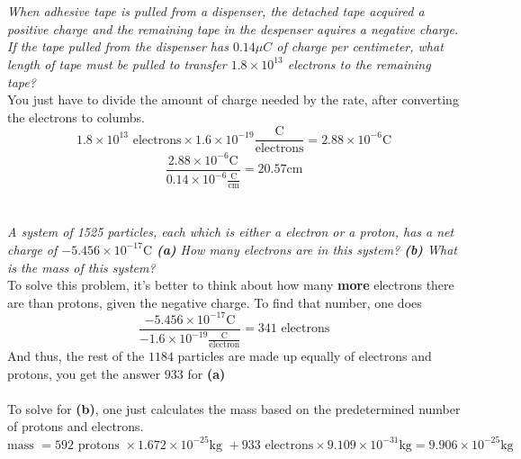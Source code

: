 \documentclass{article}
\begin{document}
\section{}
\emph{When adhesive tape is pulled from a dispenser, the detached tape acquired a positive charge and the remaining tape in the despenser aquires a negative charge. If the tape pulled from the dispenser has $0.14 \mu C$ of charge per centimeter, what length of tape must be pulled to transfer $1.8 \times 10 ^ 13$ electrons to the remaining tape? } \\
You just have to divide the amount of charge needed by the rate, after converting the electrons to columbs.
$$1.8 \times 10 ^ {13} \text{ electrons} \times 1.6 \times 10 ^ {-19} \frac{\text{C}}{\text{electrons}} = 2.88\times 10 ^ {-6} \text{C}$$
$$\frac{2.88 \times 10 ^ {-6} \text{C}}{0.14 \times 10^{-6} \frac{\text{C}}{\text {cm}}} = \boxed{20.57 \text{cm}}$$

\section{}
\emph{A system of 1525 particles, each which is either a electron or a proton, has a net charge of $-5.456\times10^{-17} \text{C}$ \textbf{(a)} How many electrons are in this system? \textbf{(b)} What is the mass of this system?} \\
To solve this problem, it's better to think about how many \textbf{more} electrons there are than protons, given the negative charge. To find that number, one does
$$\frac{-5.456 \times 10^{-17} \text {C}}{-1.6 \times 10 ^ {-19} \frac{\text{C}}{\text{electron}}} = 341 \text{ electrons}$$
And thus, the rest of the $1184$ particles are made up equally of electrons and protons, you get the answer $\boxed{933}$ for \textbf{(a)} \\~\\
To solve for \textbf{(b)}, one just calculates the mass based on the predetermined number of protons and electrons.
$$\text{mass } = 592 \text{ protons } \times 1.672 \times 10 ^ {-25} \text{kg } + 933 \text{ electrons} \times 9.109 \times 10 ^ {-31} \text {kg} = 9.906 \times 10 ^ {-25} \text {kg}$$
\end{document}
